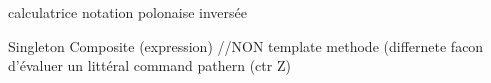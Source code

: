 calculatrice notation polonaise inversée

Singleton Composite (expression) //\-N\-O\-N template methode (differnete facon d'évaluer un littéral command pathern (ctr Z) 